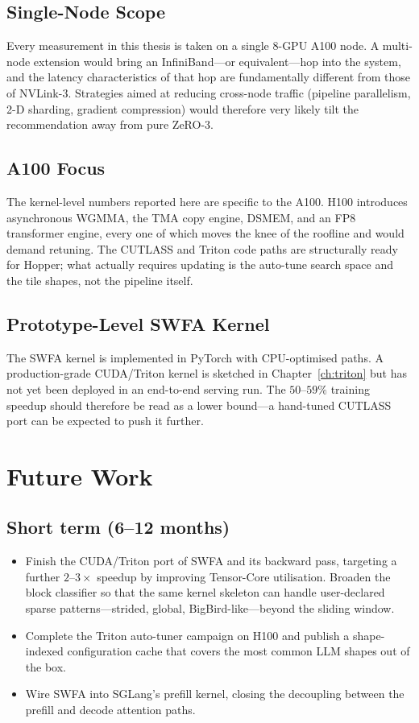 \subsection{Single-Node Scope}\label{sec:concl_single_node}
Every measurement in this thesis is taken on a single 8-GPU
A100 node. A multi-node extension would bring an InfiniBand---or
equivalent---hop into the system, and the latency characteristics
of that hop are fundamentally different from those of NVLink-3.
Strategies aimed at reducing cross-node traffic (pipeline
parallelism, 2-D sharding, gradient compression) would therefore
very likely tilt the recommendation away from pure ZeRO-3.

\subsection{A100 Focus}\label{sec:concl_a100}
The kernel-level numbers reported here are specific to the A100.
H100 introduces asynchronous WGMMA, the TMA copy engine, DSMEM,
and an FP8 transformer engine, every one of which moves the knee
of the roofline and would demand retuning. The CUTLASS and
Triton code paths are structurally ready for Hopper; what
actually requires updating is the auto-tune search space and the
tile shapes, not the pipeline itself.

\subsection{Prototype-Level SWFA
Kernel}\label{sec:concl_swfa_proto}
The SWFA kernel is implemented in PyTorch with CPU-optimised
paths. A production-grade CUDA/Triton kernel is sketched in
Chapter~\ref{ch:triton} but has not yet been deployed in an
end-to-end serving run. The $50$--$59\%$ training speedup should
therefore be read as a lower bound---a hand-tuned CUTLASS port
can be expected to push it further.

\section{Future Work}\label{sec:concl_future}

\subsection{Short term (6--12 months)}\label{sec:concl_short}
\begin{itemize}
    \item Finish the CUDA/Triton port of SWFA and its backward
          pass, targeting a further $2$--$3\times$ speedup by
          improving Tensor-Core utilisation. Broaden the block
          classifier so that the same kernel skeleton can handle
          user-declared sparse patterns---strided, global,
          BigBird-like---beyond the sliding window.
    \item Complete the Triton auto-tuner campaign on H100 and
          publish a shape-indexed configuration cache that covers
          the most common LLM shapes out of the box.
    \item Wire SWFA into SGLang's prefill kernel, closing the
          decoupling between the prefill and decode attention
          paths.
\end{itemize}

